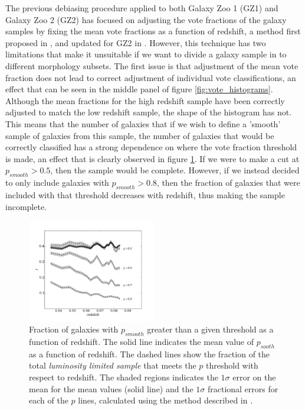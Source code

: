 \documentclass[useAMS,usenatbib]{mn2e}
\begin{document}
The previous debiasing procedure applied to both Galaxy Zoo 1 (GZ1) and Galaxy Zoo 2 (GZ2) has focused on adjusting the vote fractions of the galaxy samples by fixing the mean vote fractions as a function of redshift, a method first proposed in \cite{Bamford_09}, and updated for GZ2 in \citep{Willett_13}. However, this technique has two limitations that make it unsuitable if we want to divide a galaxy sample in to different morphology subsets. The first issue is that adjustment of the mean vote fraction does not lead to correct adjustment of individual vote classifications, an effect that can be seen in the middle panel of figure \ref{fig:vote_histograms}. Although the mean fractions for the high redshift sample have been correctly adjusted to match the low redshift sample, the shape of the histogram has not. This means that the number of galaxies that if we wish to define a 'smooth' sample of galaxies from this sample, the number of galaxies that would be correctly classified has a strong dependence on where the vote fraction threshold is made, an effect that is clearly observed in figure \ref{fig:p_bias}. If we were to make a cut at $p_{smooth} > 0.5$, then the sample would be complete. However, if we instead decided to only include galaxies with $p_{smooth} > 0.8$, then the fraction of galaxies that were included with that threshold decreases with redshift, thus making the sample incomplete.

\begin{figure}
		\centering
		
        \includegraphics[width=0.5\textwidth]{Data_imgs/p_bias.pdf}
		
        \caption{Fraction of galaxies with $p_{smooth}$ greater than a given threshold as a function of redshift. The solid line indicates the mean value of $p_{sooth}$ as a function of redshift. The dashed lines show the fraction of the total \textit{luminosity limited sample} that meets the $p$ threshold with respect to redshift. The shaded regions indicates the $1 \sigma$ error on the mean for the mean values (solid line) and the $1 \sigma$ fractional errors for each of the $p$ lines, calculated using the method described in \citet{Cameron_11}.}
		
        \label{fig:p_bias}
        
\end{figure}
\end{document}
